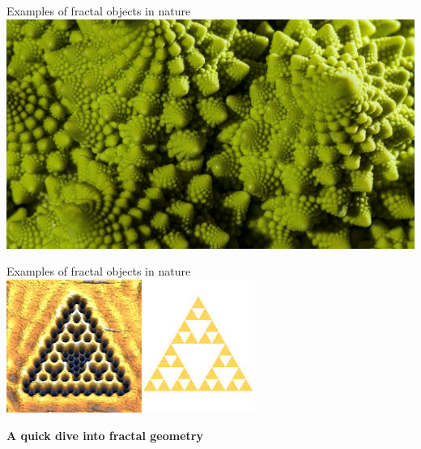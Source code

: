 \documentclass[usenames,dvipsnames,svgnames,10pt,aspectratio=169]{beamer}
\begin{document}
\begin{frame}[t, c]{Examples of fractal objects in nature}{}
	\centering
	\includegraphics[height=.66\textheight]{image_4}

	\vspace{1cm}
\end{frame}

\begin{frame}[t, c]{Examples of fractal objects in nature}{}
	\centering
	\includegraphics[height=.66\textheight]{image_5}

	\vspace{1cm}
\end{frame}



\begin{frame}[t, c]{}
	\centering
	\vspace{1cm}

	{\Large \textbf{A quick dive into fractal geometry}}

	\bigskip

	{}

\end{frame}
\end{document}
